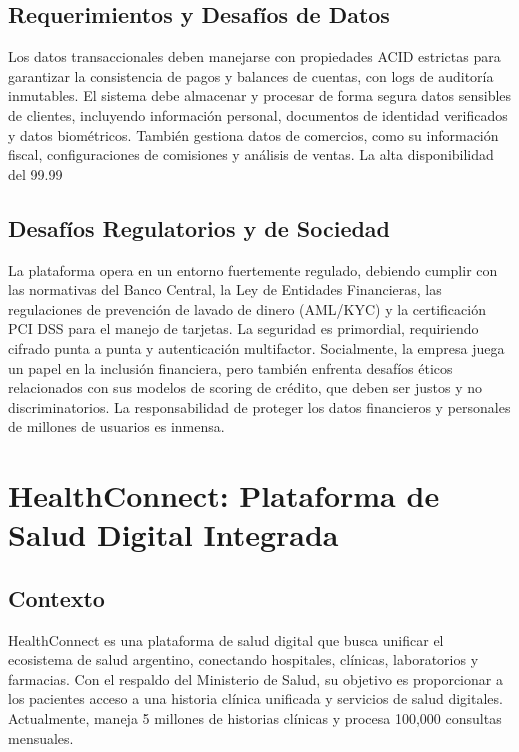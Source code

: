 \documentclass[12pt]{article}
\begin{document}
\subsection{Requerimientos y Desafíos de Datos}
Los datos transaccionales deben manejarse con propiedades ACID estrictas para garantizar la consistencia de pagos y balances de cuentas, con logs de auditoría inmutables. El sistema debe almacenar y procesar de forma segura datos sensibles de clientes, incluyendo información personal, documentos de identidad verificados y datos biométricos. También gestiona datos de comercios, como su información fiscal, configuraciones de comisiones y análisis de ventas. La alta disponibilidad del 99.99%

\subsection{Desafíos Regulatorios y de Sociedad}
La plataforma opera en un entorno fuertemente regulado, debiendo cumplir con las normativas del Banco Central, la Ley de Entidades Financieras, las regulaciones de prevención de lavado de dinero (AML/KYC) y la certificación PCI DSS para el manejo de tarjetas. La seguridad es primordial, requiriendo cifrado punta a punta y autenticación multifactor. Socialmente, la empresa juega un papel en la inclusión financiera, pero también enfrenta desafíos éticos relacionados con sus modelos de scoring de crédito, que deben ser justos y no discriminatorios. La responsabilidad de proteger los datos financieros y personales de millones de usuarios es inmensa.

\newpage

\section{HealthConnect: Plataforma de Salud Digital Integrada}

\subsection{Contexto}
HealthConnect es una plataforma de salud digital que busca unificar el ecosistema de salud argentino, conectando hospitales, clínicas, laboratorios y farmacias. Con el respaldo del Ministerio de Salud, su objetivo es proporcionar a los pacientes acceso a una historia clínica unificada y servicios de salud digitales. Actualmente, maneja 5 millones de historias clínicas y procesa 100,000 consultas mensuales.
\end{document}
